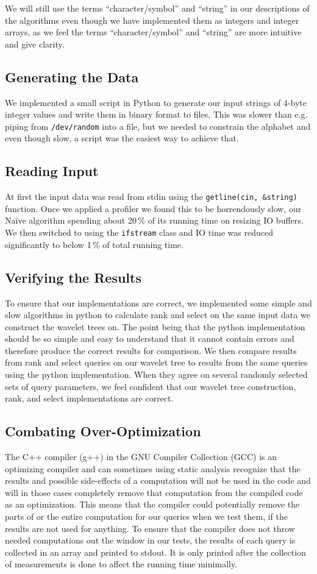 We will still use the terms “character/symbol” and “string” in our descriptions of the algorithms even though we have implemented them as integers and integer arrays, as we feel the terms “character/symbol” and “string” are more intuitive and give clarity.


\subsection{Generating the Data}
We implemented a small script in Python to generate our input strings of 4-byte integer values and write them in binary format to files.
This was slower than e.g. piping from \texttt{/dev/random} into a file, but we needed to constrain the alphabet and even though slow, a script was the easiest way to achieve that.

\subsection{Reading Input}
At first the input data was read from stdin using the \texttt{getline(cin, \&string)} function. 
Once we applied a profiler we found this to be horrendously slow, our Naïve algorithm spending about 20\,\% of its running time on resizing IO buffers. 
We then switched to using the \texttt{ifstream} class and IO time was reduced significantly to below 1\,\% of total running time.

\subsection{Verifying the Results}
To ensure that our implementations are correct, we implemented some simple and slow algorithms in python to calculate rank and select on the same input data we construct the wavelet trees on.
The point being that the python implementation should be so simple and easy to understand that it cannot contain errors and therefore produce the correct results for comparison.
We then compare results from rank and select queries on our wavelet tree to results from the same queries using the python implementation.
When they agree on several randomly selected sets of query parameters, we feel confident that our wavelet tree construction, rank, and select implementations are correct.

\subsection{Combating Over-Optimization}
The C++ compiler (g++) in the GNU Compiler Collection (GCC) is an optimizing compiler and can sometimes using static analysis recognize that the results and possible side-effects of a computation will not be used in the code and will in those cases completely remove that computation from the compiled code as an optimization.
This means that the compiler could potentially remove the parts of or the entire computation for our queries when we test them, if the results are not used for anything.
To ensure that the compiler does not throw needed computations out the window in our tests, the results of each query is collected in an array and printed to stdout. It is only printed after the collection of measurements is done to affect the running time minimally.

